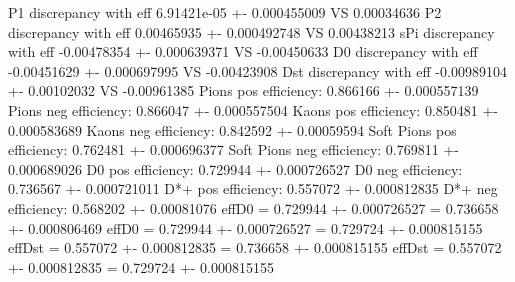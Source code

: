 P1 discrepancy with eff 6.91421e-05 +- 0.000455009 VS 0.00034636
P2 discrepancy with eff 0.00465935 +- 0.000492748 VS 0.00438213
sPi discrepancy with eff -0.00478354 +- 0.000639371 VS -0.00450633
D0 discrepancy with eff -0.00451629 +- 0.000697995 VS -0.00423908
Dst discrepancy with eff -0.00989104 +- 0.00102032 VS -0.00961385
Pions pos efficiency: 0.866166 +- 0.000557139
Pions neg efficiency: 0.866047 +- 0.000557504
Kaons pos efficiency: 0.850481 +- 0.000583689
Kaons neg efficiency: 0.842592 +- 0.00059594
Soft Pions pos efficiency: 0.762481 +- 0.000696377
Soft Pions neg efficiency: 0.769811 +- 0.000689026
D0 pos efficiency: 0.729944 +- 0.000726527
D0 neg efficiency: 0.736567 +- 0.000721011
D*+ pos efficiency: 0.557072 +- 0.000812835
D*+ neg efficiency: 0.568202 +- 0.00081076
effD0 = 0.729944 +- 0.000726527 = 0.736658 +- 0.000806469
effD0 = 0.729944 +- 0.000726527 = 0.729724 +- 0.000815155
effDst = 0.557072 +- 0.000812835 = 0.736658 +- 0.000815155
effDst = 0.557072 +- 0.000812835 = 0.729724 +- 0.000815155

